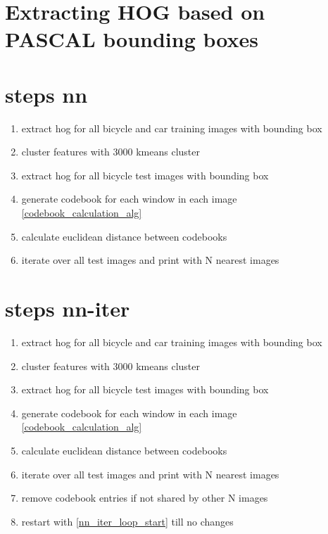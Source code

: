 

\section{Extracting HOG based on PASCAL bounding boxes}

\section{steps nn}
\begin{enumerate}
	\item extract hog for all bicycle and car training images with bounding box
	\item cluster features with 3000 kmeans cluster
	\item extract hog for all bicycle test images with bounding box
	\item generate codebook for each window in each image \ref{codebook_calculation_alg}
	\item calculate euclidean distance between codebooks
	\item iterate over all test images and print with N nearest images
\end{enumerate}
	
\section{steps nn-iter}
\begin{enumerate}
	\item extract hog for all bicycle and car training images with bounding box
	\item cluster features with 3000 kmeans cluster
	\item extract hog for all bicycle test images with bounding box
	\item generate codebook for each window in each image \ref{codebook_calculation_alg}
	\item calculate euclidean distance between codebooks
	\item iterate over all test images and print with N nearest images\label{nn_iter_loop_start}
	\item remove codebook entries if not shared by other N images
	\item restart with \ref{nn_iter_loop_start} till no changes
\end{enumerate}

